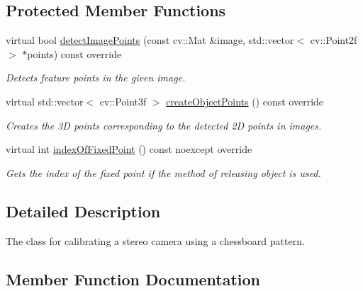 \subsection*{Protected Member Functions}
\begin{DoxyCompactItemize}
\item 
virtual bool \hyperlink{classstereo__ugv_1_1ChessboardLensCalibrator_ac6e93519a72d4218bcb1f9a49a9c22eb}{detect\+Image\+Points} (const cv\+::\+Mat \&image, std\+::vector$<$ cv\+::\+Point2f $>$ $\ast$points) const override
\begin{DoxyCompactList}\small\item\em Detects feature points in the given image. \end{DoxyCompactList}\item 
virtual std\+::vector$<$ cv\+::\+Point3f $>$ \hyperlink{classstereo__ugv_1_1ChessboardLensCalibrator_adaeaa9e0a3203872ea8e5ef5b3482f7e}{create\+Object\+Points} () const override
\begin{DoxyCompactList}\small\item\em Creates the 3D points corresponding to the detected 2D points in images. \end{DoxyCompactList}\item 
virtual int \hyperlink{classstereo__ugv_1_1ChessboardLensCalibrator_a00aa88f3399b59ec686f6d506c73a910}{index\+Of\+Fixed\+Point} () const noexcept override
\begin{DoxyCompactList}\small\item\em Gets the index of the fixed point if the method of releasing object is used. \end{DoxyCompactList}\end{DoxyCompactItemize}


\subsection{Detailed Description}
The class for calibrating a stereo camera using a chessboard pattern. 

\subsection{Member Function Documentation}
\mbox{\label{classstereo__ugv_1_1ChessboardLensCalibrator_adaeaa9e0a3203872ea8e5ef5b3482f7e}} 
